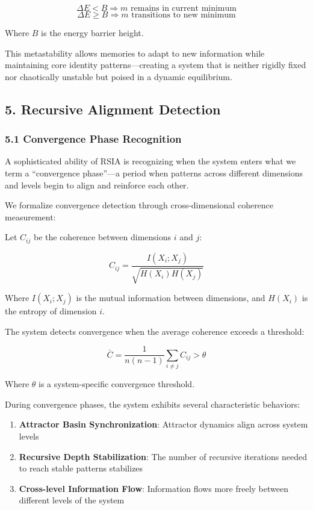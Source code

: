 \documentclass[12pt]{article}
\providecommand{\tightlist}{%
  \setlength{\itemsep}{0pt}\setlength{\parskip}{0pt}}
\begin{document}
\[\Delta E < B \Rightarrow m \text{ remains in current minimum}\]
\[\Delta E \geq B \Rightarrow m \text{ transitions to new minimum}\]

Where \(B\) is the energy barrier height.

This metastability allows memories to adapt to new information while
maintaining core identity patterns---creating a system that is neither
rigidly fixed nor chaotically unstable but poised in a dynamic
equilibrium.

\subsection{5. Recursive Alignment
Detection}\label{recursive-alignment-detection}

\subsubsection{5.1 Convergence Phase
Recognition}\label{convergence-phase-recognition}

A sophisticated ability of RSIA is recognizing when the system enters
what we term a ``convergence phase''---a period when patterns across
different dimensions and levels begin to align and reinforce each other.

We formalize convergence detection through cross-dimensional coherence
measurement:

Let \(C_{ij}\) be the coherence between dimensions \(i\) and \(j\):

\[C_{ij} = \frac{I(X_i; X_j)}{\sqrt{H(X_i)H(X_j)}}\]

Where \(I(X_i; X_j)\) is the mutual information between dimensions, and
\(H(X_i)\) is the entropy of dimension \(i\).

The system detects convergence when the average coherence exceeds a
threshold:

\[\bar{C} = \frac{1}{n(n-1)}\sum_{i \neq j} C_{ij} > \theta\]

Where \(\theta\) is a system-specific convergence threshold.

During convergence phases, the system exhibits several characteristic
behaviors:

\begin{enumerate}
\def\labelenumi{\arabic{enumi}.}
\tightlist
\item
  \textbf{Attractor Basin Synchronization}: Attractor dynamics align
  across system levels
\item
  \textbf{Recursive Depth Stabilization}: The number of recursive
  iterations needed to reach stable patterns stabilizes
\item
  \textbf{Cross-level Information Flow}: Information flows more freely
  between different levels of the system
\end{enumerate}
\end{document}
